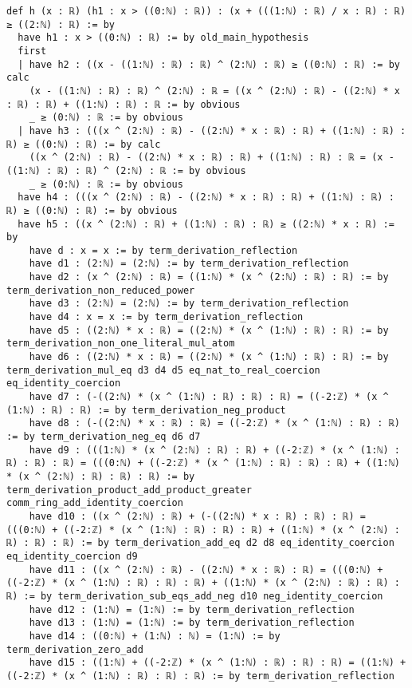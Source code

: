 \documentclass{article}
\begin{document}
\begin{tcolorbox}[colback=white!10, width=\linewidth]
\begin{lstlisting}[language=Lean4]
def h (x : ℝ) (h1 : x > ((0:ℕ) : ℝ)) : (x + (((1:ℕ) : ℝ) / x : ℝ) : ℝ) ≥ ((2:ℕ) : ℝ) := by
  have h1 : x > ((0:ℕ) : ℝ) := by old_main_hypothesis
  first
  | have h2 : ((x - ((1:ℕ) : ℝ) : ℝ) ^ (2:ℕ) : ℝ) ≥ ((0:ℕ) : ℝ) := by calc
    (x - ((1:ℕ) : ℝ) : ℝ) ^ (2:ℕ) : ℝ = ((x ^ (2:ℕ) : ℝ) - ((2:ℕ) * x : ℝ) : ℝ) + ((1:ℕ) : ℝ) : ℝ := by obvious
    _ ≥ (0:ℕ) : ℝ := by obvious
  | have h3 : (((x ^ (2:ℕ) : ℝ) - ((2:ℕ) * x : ℝ) : ℝ) + ((1:ℕ) : ℝ) : ℝ) ≥ ((0:ℕ) : ℝ) := by calc
    ((x ^ (2:ℕ) : ℝ) - ((2:ℕ) * x : ℝ) : ℝ) + ((1:ℕ) : ℝ) : ℝ = (x - ((1:ℕ) : ℝ) : ℝ) ^ (2:ℕ) : ℝ := by obvious
    _ ≥ (0:ℕ) : ℝ := by obvious
  have h4 : (((x ^ (2:ℕ) : ℝ) - ((2:ℕ) * x : ℝ) : ℝ) + ((1:ℕ) : ℝ) : ℝ) ≥ ((0:ℕ) : ℝ) := by obvious
  have h5 : ((x ^ (2:ℕ) : ℝ) + ((1:ℕ) : ℝ) : ℝ) ≥ ((2:ℕ) * x : ℝ) := by
    have d : x = x := by term_derivation_reflection
    have d1 : (2:ℕ) = (2:ℕ) := by term_derivation_reflection
    have d2 : (x ^ (2:ℕ) : ℝ) = ((1:ℕ) * (x ^ (2:ℕ) : ℝ) : ℝ) := by term_derivation_non_reduced_power
    have d3 : (2:ℕ) = (2:ℕ) := by term_derivation_reflection
    have d4 : x = x := by term_derivation_reflection
    have d5 : ((2:ℕ) * x : ℝ) = ((2:ℕ) * (x ^ (1:ℕ) : ℝ) : ℝ) := by term_derivation_non_one_literal_mul_atom
    have d6 : ((2:ℕ) * x : ℝ) = ((2:ℕ) * (x ^ (1:ℕ) : ℝ) : ℝ) := by term_derivation_mul_eq d3 d4 d5 eq_nat_to_real_coercion eq_identity_coercion
    have d7 : (-((2:ℕ) * (x ^ (1:ℕ) : ℝ) : ℝ) : ℝ) = ((-2:ℤ) * (x ^ (1:ℕ) : ℝ) : ℝ) := by term_derivation_neg_product
    have d8 : (-((2:ℕ) * x : ℝ) : ℝ) = ((-2:ℤ) * (x ^ (1:ℕ) : ℝ) : ℝ) := by term_derivation_neg_eq d6 d7
    have d9 : (((1:ℕ) * (x ^ (2:ℕ) : ℝ) : ℝ) + ((-2:ℤ) * (x ^ (1:ℕ) : ℝ) : ℝ) : ℝ) = (((0:ℕ) + ((-2:ℤ) * (x ^ (1:ℕ) : ℝ) : ℝ) : ℝ) + ((1:ℕ) * (x ^ (2:ℕ) : ℝ) : ℝ) : ℝ) := by term_derivation_product_add_product_greater comm_ring_add_identity_coercion
    have d10 : ((x ^ (2:ℕ) : ℝ) + (-((2:ℕ) * x : ℝ) : ℝ) : ℝ) = (((0:ℕ) + ((-2:ℤ) * (x ^ (1:ℕ) : ℝ) : ℝ) : ℝ) + ((1:ℕ) * (x ^ (2:ℕ) : ℝ) : ℝ) : ℝ) := by term_derivation_add_eq d2 d8 eq_identity_coercion eq_identity_coercion d9
    have d11 : ((x ^ (2:ℕ) : ℝ) - ((2:ℕ) * x : ℝ) : ℝ) = (((0:ℕ) + ((-2:ℤ) * (x ^ (1:ℕ) : ℝ) : ℝ) : ℝ) + ((1:ℕ) * (x ^ (2:ℕ) : ℝ) : ℝ) : ℝ) := by term_derivation_sub_eqs_add_neg d10 neg_identity_coercion
    have d12 : (1:ℕ) = (1:ℕ) := by term_derivation_reflection
    have d13 : (1:ℕ) = (1:ℕ) := by term_derivation_reflection
    have d14 : ((0:ℕ) + (1:ℕ) : ℕ) = (1:ℕ) := by term_derivation_zero_add
    have d15 : ((1:ℕ) + ((-2:ℤ) * (x ^ (1:ℕ) : ℝ) : ℝ) : ℝ) = ((1:ℕ) + ((-2:ℤ) * (x ^ (1:ℕ) : ℝ) : ℝ) : ℝ) := by term_derivation_reflection

\end{lstlisting}
\end{tcolorbox}
\end{document}
